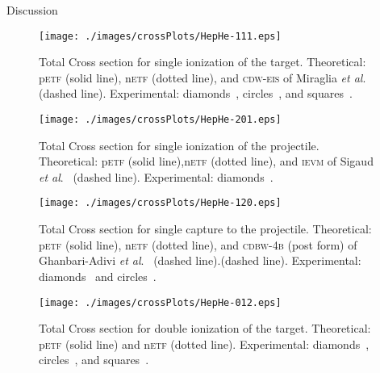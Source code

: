 \documentclass[aps, pra, reprint, groupedaddress, amsfonts,
               amsmath, amssymb, showpacs, nofootinbib]{revtex4-1}
\begin{document}
\begin{section}{Discussion \label{sec:disc}}

   \begin{figure}[htp]
      \centering
      \texttt{[image: ./images/crossPlots/HepHe-111.eps]}
      \caption{Total Cross section for single ionization of the target.
               Theoretical: p\textsc{etf} (solid line), n\textsc{etf} (dotted line), and
                            \textsc{cdw-eis} of Miraglia \textit{et al}.~\cite{MG-10} (dashed line).
               Experimental: diamonds~\cite{Dub-89}, circles~\cite{FTFHLP-95}, and squares~\cite{DT-88}.
               \label{fig:cs111}}
   \end{figure}

   \begin{figure}[htp]
      \centering
      \texttt{[image: ./images/crossPlots/HepHe-201.eps]}
      \caption{Total Cross section for single ionization of the projectile.
               Theoretical: p\textsc{etf} (solid line),n\textsc{etf} (dotted line), and
                            \textsc{ievm} of Sigaud \textit{et al}.~\cite{SM-03} (dashed line).
               Experimental: diamonds~\cite{Dub-89}. \label{fig:cs201}}
   \end{figure}

   \begin{figure}[htp]
      \centering
      \texttt{[image: ./images/crossPlots/HepHe-120.eps]}
      \caption{Total Cross section for single capture to the projectile.
               Theoretical: p\textsc{etf} (solid line), n\textsc{etf} (dotted line), and
                            \textsc{cdbw-4b} (post form) of Ghanbari-Adivi \textit{et al}.~\cite{GAG15}
                            (dashed line).(dashed line).
               Experimental: diamonds~\cite{Dub-89} and circles~\cite{FTFHLP-95}. \label{fig:cs120}}
   \end{figure}

   \begin{figure}[htp]
      \centering
      \texttt{[image: ./images/crossPlots/HepHe-012.eps]}
      \caption{Total Cross section for double ionization of the target.
               Theoretical: p\textsc{etf} (solid line) and n\textsc{etf} (dotted line).
               Experimental: diamonds~\cite{Dub-89}, circles~\cite{FTFHLP-95}, and squares~\cite{DT-88}.
               \label{fig:cs012}}
   \end{figure}


\end{section}
\end{document}
